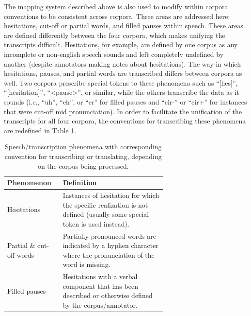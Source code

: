 \documentclass[12pt]{article}
\begin{document}
The mapping system described above is also used to modify within corpora conventions to be consistent across corpora. Three areas are addressed here:
hesitations, cut-off or partial words, and filled pauses within speech. These areas are defined differently between the four corpora, which makes
unifying the transcripts difficult. Hesitations, for example, are defined by one corpus as any incomplete or non-english speech sounds and left
completely undefined by another (despite annotators making notes about hesitations). The way in which hesitations, pauses, and partial words are
transcribed differs between corpora as well. Two corpora prescribe special tokens to these phenomena such as ``[hes]'', ``[hesitation]'', ``<pause>'',
or similar, while the others transcribe the data as it sounds (i.e., ``uh'', ``eh'', or ``er'' for filled pauses and ``cir-'' or ``cir+'' for
instances that were cut-off mid pronunciation). In order to facilitate the unification of the transcripts for all four corpora, the conventions for
transcribing these phenomena are redefined in Table \ref{tab:phenomena_definitions}.

\begin{table}[!t]
    \centering
    \begin{tabular}{l p{0.65\linewidth}}
        \toprule
        Phenomenon               & Definition                                                                                                              \\
        \midrule
        Hesitations              & Instances of hesitation for which the specific realization is not defined (usually some special token is used instead). \\
        \midrule
        Partial \& cut-off words & Partially pronounced words are indicated by a hyphen character where the pronunciation of the word is missing.          \\
        \midrule
        Filled pauses            & Hesitations with a verbal component that has been described or otherwise defined by the corpus/annotator.               \\
        \bottomrule
    \end{tabular}
    \caption{Speech/transcription phenomena with corresponding convention for transcribing or translating, depending on the corpus being processed.}
    \label{tab:phenomena_definitions}
\end{table}
\end{document}
